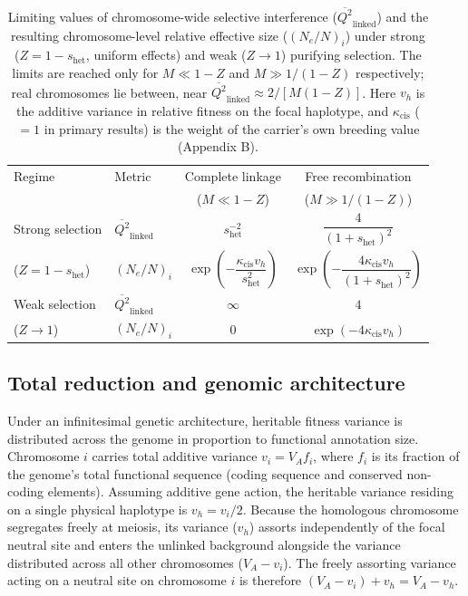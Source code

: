 \documentclass[12pt]{article}
\begin{document}
\begin{table}[h!]
\centering
\caption{Limiting values of chromosome-wide selective interference ($\overline{Q^2}_\text{linked}$) and the resulting chromosome-level relative effective size ($(N_e/N)_i$) under strong ($Z = 1 - s_\text{het}$, uniform effects) and weak ($Z \to 1$) purifying selection. The limits are reached only for $M \ll 1 - Z$ and $M \gg 1/(1-Z)$ respectively; real chromosomes lie between, near $\overline{Q^2}_\text{linked} \approx 2/[M(1-Z)]$. Here $v_h$ is the additive variance in relative fitness on the focal haplotype, and $\kappa_\text{cis}$ ($= 1$ in primary results) is the weight of the carrier's own breeding value (Appendix B).}
\label{tab:linked_limits}
\begin{tabular}{llcc}
\toprule
Regime & Metric & Complete linkage & Free recombination \\
& & ($M \ll 1-Z$) & ($M \gg 1/(1-Z)$) \\
\midrule
Strong selection & $\overline{Q^2}_\text{linked}$ & $s_\text{het}^{-2}$ & $\dfrac{4}{(1 + s_\text{het})^2}$ \\[2ex]
($Z = 1 - s_\text{het}$) & $(N_e/N)_i$ & $\exp\!\left(-\dfrac{\kappa_\text{cis} v_h}{s_\text{het}^2}\right)$ & $\exp\!\left(-\dfrac{4\kappa_\text{cis} v_h}{(1 + s_\text{het})^2}\right)$ \\
\addlinespace[1.5ex]
\midrule
Weak selection & $\overline{Q^2}_\text{linked}$ & $\infty$ & $4$ \\[2ex]
($Z \to 1$) & $(N_e/N)_i$ & $0$ & $\exp(-4\kappa_\text{cis} v_h)$ \\
\bottomrule
\end{tabular}
\end{table}

\subsection{Total reduction and genomic architecture}\label{variance_partitioning}
Under an infinitesimal genetic architecture, heritable fitness variance is distributed across the genome in proportion to functional annotation size. Chromosome $i$ carries total additive variance $v_i = V_A f_i$, where $f_i$ is its fraction of the genome's total functional sequence (coding sequence and conserved non-coding elements). Assuming additive gene action, the heritable variance residing on a single physical haplotype is $v_h = v_i / 2$. Because the homologous chromosome segregates freely at meiosis, its variance ($v_h$) assorts independently of the focal neutral site and enters the unlinked background alongside the variance distributed across all other chromosomes ($V_A - v_i$). The freely assorting variance acting on a neutral site on chromosome $i$ is therefore $(V_A - v_i) + v_h = V_A - v_h$.
\end{document}
